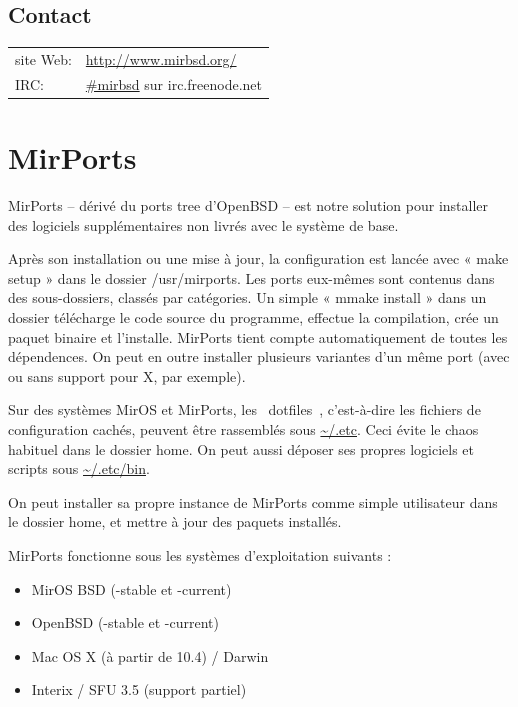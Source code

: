 \documentclass[a4paper,landscape,11pt,notumble]{leaflet}
\begin{document}
\subsection{Contact}
{\large
\begin{tabular}{ll}
site Web: & \textcolor{darkred}{\url{http://www.mirbsd.org/}}\\
IRC: & \textcolor{darkred}{\url{#mirbsd}} sur irc.freenode.net\\
\end{tabular}
\par}
\vspace{3ex}%
\graybox

\newpage

\section{MirPorts}

MirPorts -- dérivé du ports tree d’OpenBSD -- est notre solution pour installer des logiciels supplémentaires non livrés avec le système de base.

Après son installation ou une mise à jour, la configuration est lancée avec « make setup » dans le dossier /usr/mirports. Les ports eux-mêmes sont contenus dans des sous-dossiers, classés par catégories. Un simple « mmake install » dans un dossier télécharge le code source du programme, effectue la compilation, crée un paquet binaire et l’installe. MirPorts tient compte automatiquement de toutes les dépendences. On peut en outre installer plusieurs variantes d’un même port (avec ou sans support pour X, par exemple).

Sur des systèmes MirOS et MirPorts, les \flqq~dotfiles~\frqq, c’est-à-dire les fichiers de configuration cachés, peuvent être rassemblés sous \url{~/.etc}. Ceci évite le chaos habituel dans le dossier home. On peut aussi déposer ses propres logiciels et scripts sous \url{~/.etc/bin}.

On peut installer sa propre instance de MirPorts comme simple utilisateur dans le dossier home, et mettre à jour des paquets installés.

MirPorts fonctionne sous les systèmes d’exploitation suivants :

\begin{itemize}
\item MirOS BSD (-stable et -current)
\item OpenBSD (-stable et -current)
\item Mac OS X (à partir de 10.4) / Darwin
\item Interix / SFU 3.5 (support partiel)
\end{itemize}
\end{document}
